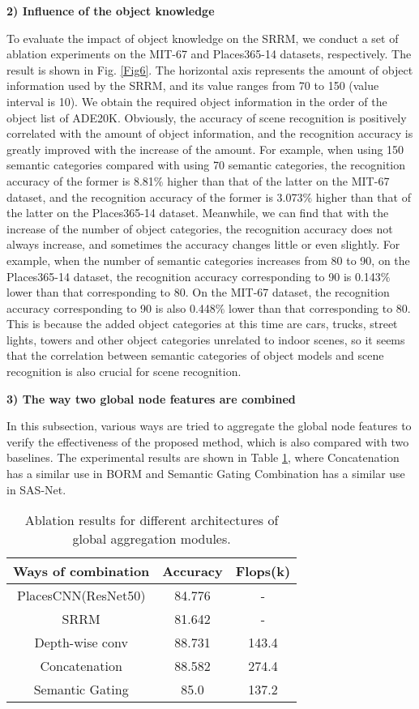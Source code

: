 \documentclass[conference]{IEEEtran}
\begin{document}
\textbf{2) Influence of the object knowledge}

To evaluate the impact of object knowledge on the SRRM, we conduct a set of ablation experiments on the MIT-67 and Places365-14 datasets, respectively. The result is shown in Fig. \ref{Fig6}. The horizontal axis represents the amount of object information used by the SRRM, and its value ranges from 70 to 150 (value interval is 10). We obtain the required object information in the order of the object list of ADE20K. Obviously, the accuracy of scene recognition is positively correlated with the amount of object information, and the recognition accuracy is greatly improved with the increase of the amount. For example, when using 150 semantic categories compared with using 70 semantic categories, the recognition accuracy of the former is 8.81$\%$ higher than that of the latter on the MIT-67 dataset, and the recognition accuracy of the former is 3.073$\%$ higher than that of the latter on the Places365-14 dataset. Meanwhile, we can find that with the increase of the number of object categories, the recognition accuracy does not always increase, and sometimes the accuracy changes little or even slightly. For example, when the number of semantic categories increases from 80 to 90, on the Places365-14 dataset, the recognition accuracy corresponding to 90 is 0.143$\%$ lower than that corresponding to 80. On the MIT-67 dataset, the recognition accuracy corresponding to 90 is also 0.448$\%$ lower than that corresponding to 80. This is because the added object categories at this time are cars, trucks, street lights, towers and other object categories unrelated to indoor scenes, so it seems that the correlation between semantic categories of object models and scene recognition is also crucial for scene recognition.

\textbf{3) The way two global node features are combined}

In this subsection, various ways are tried to aggregate the global node features to verify the effectiveness of the proposed method, which is also compared with two baselines. The experimental results are shown in Table \ref{tab2}, where Concatenation has a similar use in BORM\cite{ref20} and Semantic Gating Combination has a similar use in SAS-Net\cite{ref17}.

\begin{table}[htbp]
    \centering
    \caption{Ablation results for different architectures of global aggregation modules.}
    \begin{tabular}{ccc}
    \hline
        \textbf{Ways of combination} & \textbf{Accuracy} & \textbf{Flops(k)}  \\ \hline
        PlacesCNN(ResNet50) & 84.776 & -  \\ 
        SRRM & 81.642 & -  \\ 
        Depth-wise conv & 88.731 & 143.4  \\ 
        Concatenation & 88.582 & 274.4  \\ 
        Semantic Gating & 85.0 & 137.2  \\ \hline
    \end{tabular}
    \label{tab2}
\end{table}
\end{document}
